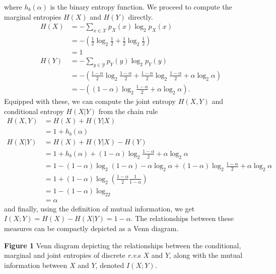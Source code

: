 \documentclass[11pt, letterpaper]{article}
\newcommand{\mc}[1]{\mathcal{#1}}
\begin{document}
where $h_b(\alpha)$ is the binary entropy function. We proceed to compute the marginal entropies $H(X)$ and $H(Y)$ directly.
\begin{align*}
    H(X)&=-\sum_{x\in\mc{X}}p_X(x)\log_2p_X(x)\\
    &=-\left(\frac{1}{2}\log_2\frac{1}{2}+\frac{1}{2}\log_2\frac{1}{2}\right)\\
    &=1\\
    H(Y)&=-\sum_{y\in\mc{Y}}p_Y(y)\log_2p_Y(y)\\
    &=-\left(\frac{1-\alpha}{2}\log_2\frac{1-\alpha}{2}+\frac{1-\alpha}{2}\log_2\frac{1-\alpha}{2}+\alpha\log_2\alpha\right)\\
    &=-\left((1-\alpha)\log_2\frac{1-\alpha}{2}+\alpha\log_2\alpha\right).
\end{align*}
Equipped with these, we can compute the joint entropy $H(X,Y)$ and conditional entropy $H(X|Y)$ from the chain rule
\begin{align*}
    H(X,Y)&=H(X)+H(Y|X)\\
    &=1+h_b(\alpha)\\
    H(X|Y)&=H(X)+H(Y|X)-H(Y)\\
    &=1+h_b(\alpha)+(1-\alpha)\log_2\frac{1-\alpha}{2}+\alpha\log_2\alpha\\
    &=1-(1-\alpha)\log_2(1-\alpha)-\alpha\log_2\alpha+(1-\alpha)\log_2\frac{1-\alpha}{2}+\alpha\log_2\alpha\\
    &=1+(1-\alpha)\log_2\left(\frac{1-\alpha}{2}\frac{1}{1-\alpha}\right)\\
    &=1-(1-\alpha)\log_22\\
    &=\alpha
\end{align*}
and finally, using the definition of mutual information, we get $I(X;Y)=H(X)-H(X|Y)=1-\alpha$. The relationships between these measures can be compactly depicted
as a Venn diagram.
\begin{center}
\end{center}
{\bf Figure 1} Venn diagram depicting the relationships between the conditional, marginal and joint entropies of discrete {\it r.v.}s $X$ and $Y$, along with
the mutual information between $X$ and $Y$, denoted $I(X;Y)$.\\[10pt]
\end{document}
